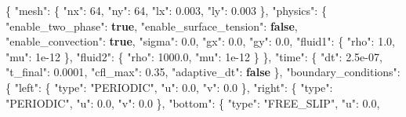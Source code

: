 \documentclass[
  10pt,
]{article}
\newenvironment{Shaded}{}{}
\newcommand{\DataTypeTok}[1]{\textcolor[rgb]{0.56,0.13,0.00}{#1}}
\newcommand{\DecValTok}[1]{\textcolor[rgb]{0.25,0.63,0.44}{#1}}
\newcommand{\FloatTok}[1]{\textcolor[rgb]{0.25,0.63,0.44}{#1}}
\newcommand{\FunctionTok}[1]{\textcolor[rgb]{0.02,0.16,0.49}{#1}}
\newcommand{\KeywordTok}[1]{\textcolor[rgb]{0.00,0.44,0.13}{\textbf{#1}}}
\newcommand{\StringTok}[1]{\textcolor[rgb]{0.25,0.44,0.63}{#1}}
\begin{document}
\begin{Shaded}
\begin{Highlighting}[]
\FunctionTok{\{}
  \DataTypeTok{"mesh"}\FunctionTok{:} \FunctionTok{\{}
    \DataTypeTok{"nx"}\FunctionTok{:} \DecValTok{64}\FunctionTok{,}
    \DataTypeTok{"ny"}\FunctionTok{:} \DecValTok{64}\FunctionTok{,}
    \DataTypeTok{"lx"}\FunctionTok{:} \FloatTok{0.003}\FunctionTok{,}
    \DataTypeTok{"ly"}\FunctionTok{:} \FloatTok{0.003}
  \FunctionTok{\},}
  \DataTypeTok{"physics"}\FunctionTok{:} \FunctionTok{\{}
    \DataTypeTok{"enable\_two\_phase"}\FunctionTok{:} \KeywordTok{true}\FunctionTok{,}
    \DataTypeTok{"enable\_surface\_tension"}\FunctionTok{:} \KeywordTok{false}\FunctionTok{,}
    \DataTypeTok{"enable\_convection"}\FunctionTok{:} \KeywordTok{true}\FunctionTok{,}
    \DataTypeTok{"sigma"}\FunctionTok{:} \FloatTok{0.0}\FunctionTok{,}
    \DataTypeTok{"gx"}\FunctionTok{:} \FloatTok{0.0}\FunctionTok{,}
    \DataTypeTok{"gy"}\FunctionTok{:} \FloatTok{0.0}\FunctionTok{,}
    \DataTypeTok{"fluid1"}\FunctionTok{:} \FunctionTok{\{}
      \DataTypeTok{"rho"}\FunctionTok{:} \FloatTok{1.0}\FunctionTok{,}
      \DataTypeTok{"mu"}\FunctionTok{:} \DecValTok{1e{-}12}
    \FunctionTok{\},}
    \DataTypeTok{"fluid2"}\FunctionTok{:} \FunctionTok{\{}
      \DataTypeTok{"rho"}\FunctionTok{:} \FloatTok{1000.0}\FunctionTok{,}
      \DataTypeTok{"mu"}\FunctionTok{:} \DecValTok{1e{-}12}
    \FunctionTok{\}}
  \FunctionTok{\},}
  \DataTypeTok{"time"}\FunctionTok{:} \FunctionTok{\{}
    \DataTypeTok{"dt"}\FunctionTok{:} \FloatTok{2.5e{-}07}\FunctionTok{,}
    \DataTypeTok{"t\_final"}\FunctionTok{:} \FloatTok{0.0001}\FunctionTok{,}
    \DataTypeTok{"cfl\_max"}\FunctionTok{:} \FloatTok{0.35}\FunctionTok{,}
    \DataTypeTok{"adaptive\_dt"}\FunctionTok{:} \KeywordTok{false}
  \FunctionTok{\},}
  \DataTypeTok{"boundary\_conditions"}\FunctionTok{:} \FunctionTok{\{}
    \DataTypeTok{"left"}\FunctionTok{:} \FunctionTok{\{}
      \DataTypeTok{"type"}\FunctionTok{:} \StringTok{"PERIODIC"}\FunctionTok{,}
      \DataTypeTok{"u"}\FunctionTok{:} \FloatTok{0.0}\FunctionTok{,}
      \DataTypeTok{"v"}\FunctionTok{:} \FloatTok{0.0}
    \FunctionTok{\},}
    \DataTypeTok{"right"}\FunctionTok{:} \FunctionTok{\{}
      \DataTypeTok{"type"}\FunctionTok{:} \StringTok{"PERIODIC"}\FunctionTok{,}
      \DataTypeTok{"u"}\FunctionTok{:} \FloatTok{0.0}\FunctionTok{,}
      \DataTypeTok{"v"}\FunctionTok{:} \FloatTok{0.0}
    \FunctionTok{\},}
    \DataTypeTok{"bottom"}\FunctionTok{:} \FunctionTok{\{}
      \DataTypeTok{"type"}\FunctionTok{:} \StringTok{"FREE\_SLIP"}\FunctionTok{,}
      \DataTypeTok{"u"}\FunctionTok{:} \FloatTok{0.0}\FunctionTok{,}

\end{Highlighting}
\end{Shaded}
\end{document}

